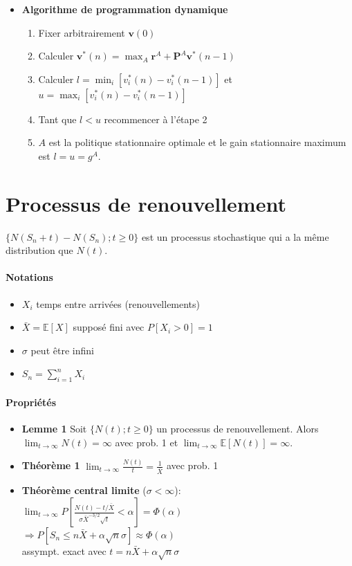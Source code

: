 \documentclass[paper=a4,fontsize=8pt,pagesize,DIV=calc]{scrartcl}
\newcounter{row}
\begin{document}
\begin{multicols}{3}
\begin{itemize}
\begin{itemize}
\end{itemize}
\item \textbf{Algorithme de programmation dynamique}
\begin{enumerate}
\item Fixer arbitrairement $\bm{v}(0)$
\item Calculer $\bm{v}^*(n) = \max_A{\bm{r}^A + \bm{P}^A\bm{v}^*(n - 1)}$
\item Calculer $l = \min_i [v^*_i (n) - v^*_i (n - 1)]$ et $ u = \max_i[v^*_i (n) - v^*_i (n - 1)]$
\item Tant que $l < u$ recommencer à l’étape 2
\item $ A$ est la politique stationnaire optimale et le gain stationnaire maximum est $l = u = g^A$.
\end{enumerate}
\end{itemize}
\section{Processus de renouvellement}
$\{N(S_n + t) - N(S_n); t \geq 0\}$ est un processus stochastique qui a la même distribution que $N(t)$.
\paragraph{Notations}
\begin{itemize}
\item $X_i$ temps entre arrivées (renouvellements)
\item $\bar{X}= \mathbb{E}[X]$ supposé fini avec $P[X_i >0] =1$
\item $\sigma$ peut être infini
\item $S_n =\sum_{i=1}^n X_i$
\end{itemize}
\paragraph{Propriétés}
\begin{itemize}
\item \textbf{Lemme 1} Soit $\{N(t); t \geq 0\}$ un processus de renouvellement. Alors
$\lim_{t\to\infty}N(t) = \infty$ avec prob. 1
et $\lim_{t\to\infty}\mathbb{E}[N(t)] = \infty$.
\item \textbf{Théorème 1} $\lim_{t\to\infty}
\frac{N(t)}{t}=\frac{1}{\bar{X}}$ avec prob. 1
\item \textbf{Théorème central limite} ($\sigma<\infty$):
\\$\lim_{t\to\infty}P\left[ \frac{N(t)-t/\bar{X}}{\sigma \bar{X}^{-3/2}\sqrt{t}}<\alpha\right]=\Phi(\alpha)$
\\$\Rightarrow P\left[ S_n\leq n\bar{X}+\alpha \sqrt{n}\sigma \right]\approx \Phi(\alpha)$
\\ assympt. exact avec $t=n\bar{X}+\alpha \sqrt{n}\sigma$
\end{itemize}

\end{multicols}
\end{document}

